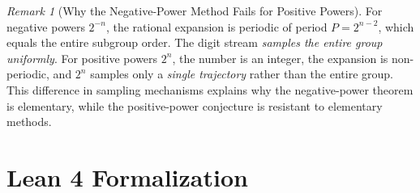 \documentclass[11pt,reqno]{amsart}
\theoremstyle{plain}
\theoremstyle{definition}
\theoremstyle{remark}
\newtheorem{remark}[theorem]{Remark}
\begin{document}
\begin{remark}[Why the Negative-Power Method Fails for Positive Powers]
For negative powers $2^{-n}$, the rational expansion is periodic of period $P = 2^{n-2}$, which equals the entire subgroup order. The digit stream \emph{samples the entire group uniformly}. For positive powers $2^n$, the number is an integer, the expansion is non-periodic, and $2^n$ samples only a \emph{single trajectory} rather than the entire group. This difference in sampling mechanisms explains why the negative-power theorem is elementary, while the positive-power conjecture is resistant to elementary methods.
\end{remark}

\section{Lean 4 Formalization}\label{sec:formalization}
\end{document}
